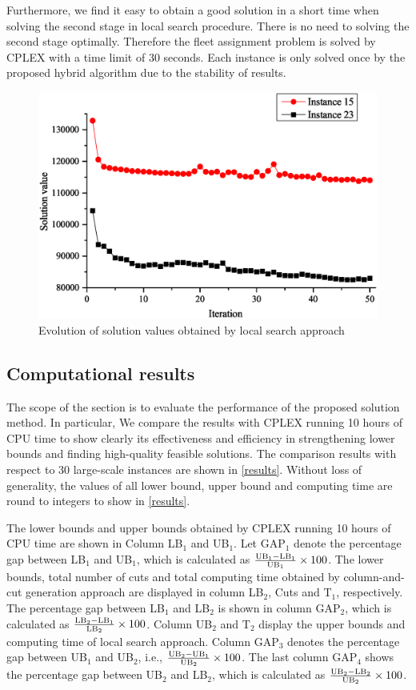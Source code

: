 \documentclass[11pt,nonblindrev,fleqn]{article}
\begin{document}
Furthermore, we find it easy to obtain a good solution in a short time when solving the second stage in local search procedure. There is no need to solving the second stage optimally. Therefore the fleet assignment problem is solved by CPLEX with a time limit of 30 seconds. Each instance is only solved once by the proposed hybrid algorithm due to the stability of results.
\begin{figure}[H]
\setlength{\abovecaptionskip}{-5pt}
\setlength{\belowcaptionskip}{-5pt}
\centering
\includegraphics[width=0.7\linewidth]{F4.eps}
\caption{Evolution of solution values obtained by local search approach}
\label{Evolution}
\end{figure}

\subsection{Computational results}
The scope of the section is to evaluate the performance of the proposed solution method. In particular, We compare the results with CPLEX running 10 hours of CPU time to show clearly its effectiveness and efficiency in strengthening lower bounds and finding high-quality feasible solutions. The comparison results with respect to 30 large-scale instances are shown in \autoref{results}. Without loss of generality, the values of all lower bound, upper bound and computing time are round to integers to show in \autoref{results}.

The lower bounds and upper bounds obtained by CPLEX running 10 hours of CPU time are shown in Column LB$_1$ and UB$_1$. Let GAP$_1$ denote the percentage gap between LB$_1$ and UB$_1$, which is calculated as $\rm \frac{UB_1 - LB_1}{UB_1}\times 100$. The lower bounds, total number of cuts and total computing time obtained by column-and-cut generation approach are displayed in column LB$_2$, Cuts and T$_1$, respectively. The percentage gap between LB$_1$ and LB$_2$ is shown in column GAP$_2$, which is calculated as $\rm \frac{LB_2 - LB_1}{LB_2}\times 100$. Column UB$_2$ and T$_2$ display the upper bounds and computing time of local search approach. Column GAP$_3$ denotes the percentage gap between UB$_1$ and UB$_2$, i.e., $\rm \frac{UB_2 - UB_1}{UB_2}\times 100$. The last column GAP$_4$ shows the percentage gap between UB$_2$ and LB$_2$, which is calculated as $\rm \frac{UB_2 - LB_2}{UB_2}\times 100$.
\end{document}
